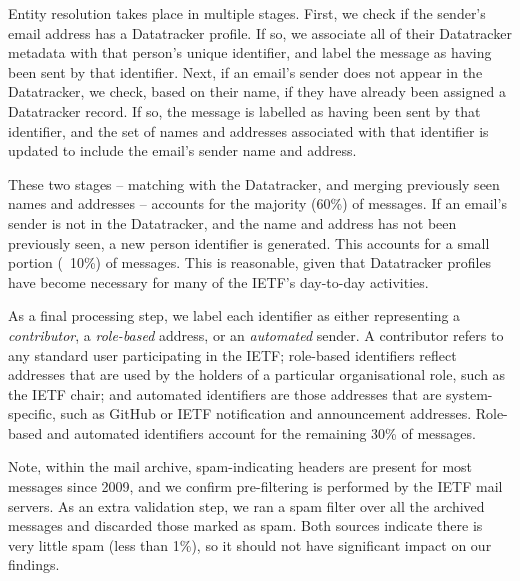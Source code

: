 \documentclass[twocolumn,10pt]{article}
\newcommand{\pb}[1]{\vspace{0.75ex}\noindent{\textbf{#1}}}
\begin{document}
Entity resolution takes place in multiple stages.  First, we check if the
sender's email address has a Datatracker profile. If so, we associate all
of their Datatracker metadata with that person's unique identifier, and
label the message as having been sent by that identifier.  Next, if an
email's sender does not appear in the Datatracker, we check, based on their
name, if they have already been assigned a Datatracker record. If so, the
message is labelled as having been sent by that identifier, and the set of
names and addresses associated with that identifier is updated to include
the email's sender name and address.

These two stages -- matching with the Datatracker, and merging previously
seen names and addresses -- accounts for the majority (60\%) of messages.
If an email's sender is not in the Datatracker, and the name and address
has not been previously seen, a new person identifier is generated. This
accounts for a small portion (~10\%) of messages. This is reasonable, given
that Datatracker profiles have become necessary for many of the IETF's
day-to-day activities.

As a final processing step, we label each identifier as either representing
a \emph{contributor}, a \emph{role-based} address, or an \emph{automated}
sender. A contributor refers to any standard user participating in the
IETF; role-based identifiers reflect addresses that are used by the holders
of a particular organisational role, such as the IETF chair; and automated
identifiers are those addresses that are system-specific, such as GitHub or
IETF notification and announcement addresses. Role-based and automated
identifiers account for the remaining 30\% of messages.

Note, within the mail archive, spam-indicating headers are present for most
messages since 2009, and we confirm pre-filtering is performed by the IETF
mail servers.  As an extra validation step, we ran a spam filter over all
the archived messages and discarded those marked as spam. Both sources
indicate there is very little spam (less than 1\%), so it should not have
significant impact on our findings.

\end{document}
